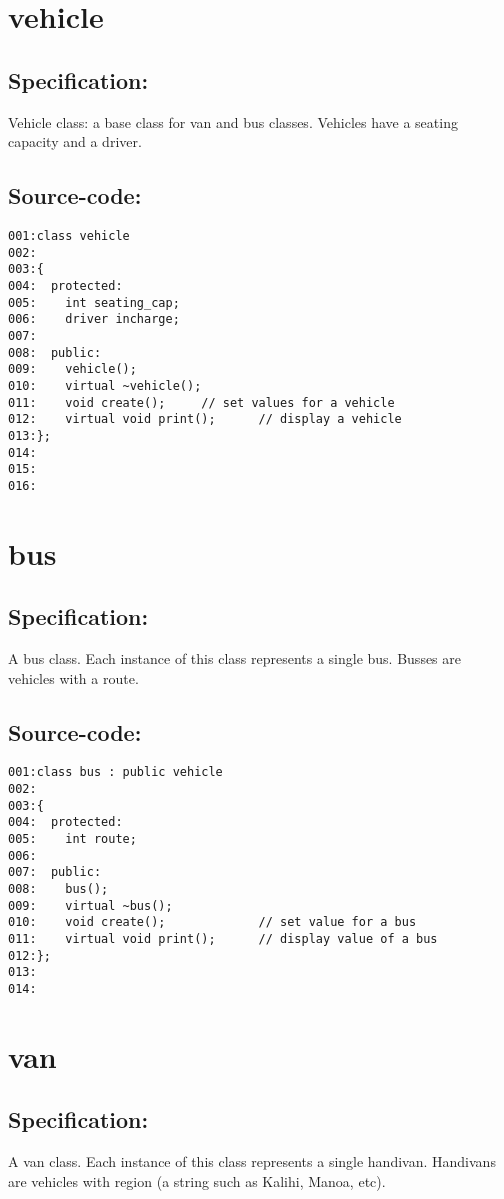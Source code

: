 \section{vehicle}
\subsection*{Specification:}
Vehicle class: a base class for van and bus classes.
   Vehicles have a seating capacity and a driver.
\subsection*{Source-code:}
\begin{verbatim}
001:class vehicle
002:
003:{
004:  protected:
005:    int seating_cap;
006:    driver incharge;
007:
008:  public: 
009:    vehicle();
010:    virtual ~vehicle();
011:    void create();     // set values for a vehicle
012:    virtual void print();      // display a vehicle
013:};
014:
015:
016:
\end{verbatim}
\section{bus}
\subsection*{Specification:}
A bus class. Each instance of this class represents a
   single bus. Busses are vehicles with a route.
\subsection*{Source-code:}
\begin{verbatim}
001:class bus : public vehicle
002:
003:{
004:  protected:
005:    int route;
006:
007:  public: 
008:    bus();
009:    virtual ~bus();
010:    void create();             // set value for a bus
011:    virtual void print();      // display value of a bus
012:};
013:
014:
\end{verbatim}
\section{van}
\subsection*{Specification:}
A van class. Each instance of this class represents a single
   handivan. Handivans are vehicles with region (a string such
   as Kalihi, Manoa, etc).
